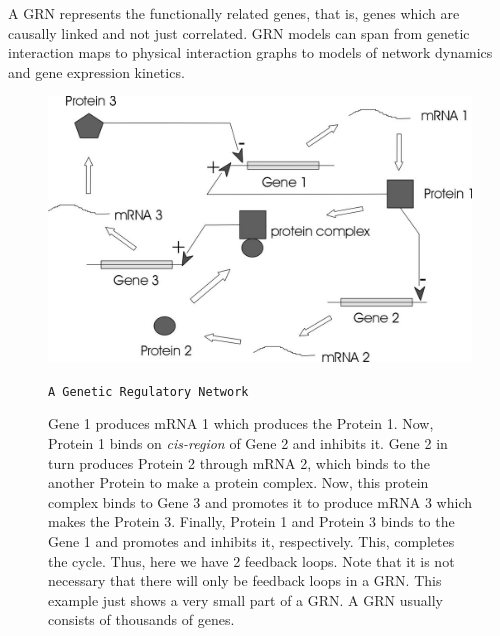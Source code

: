 \documentclass[oneside, a4paper, 11pt]{book}
\begin{document}
A GRN represents the functionally related genes, that is, genes which are causally linked and not just correlated. GRN models can span from genetic interaction maps to physical interaction graphs to models of network dynamics and gene expression kinetics. \medskip

\begin{figure}[h]
    \centering
    \includegraphics[scale=0.70]{regulation.JPG}
    \caption {\texttt{A Genetic Regulatory Network}}
    \captionsetup{singlelinecheck=off,font=footnotesize, width=0.8\textwidth}
    \caption*{Gene 1 produces mRNA 1 which produces the Protein 1. Now, Protein 1 binds on \textit{cis-region} of Gene 2 and inhibits it. Gene 2 in turn produces Protein 2 through mRNA 2, which binds to the another Protein to make a protein complex. Now, this protein complex binds to Gene 3 and promotes it to produce mRNA 3 which makes the Protein 3. Finally, Protein 1 and Protein 3 binds to the Gene 1 and promotes and inhibits it, respectively. This, completes the cycle. Thus, here we have 2 feedback loops. Note that it is not necessary that there will only be feedback loops in a GRN. This example just shows a very small part of a GRN. A GRN usually consists of thousands of genes.}
\end{figure}
\end{document}
